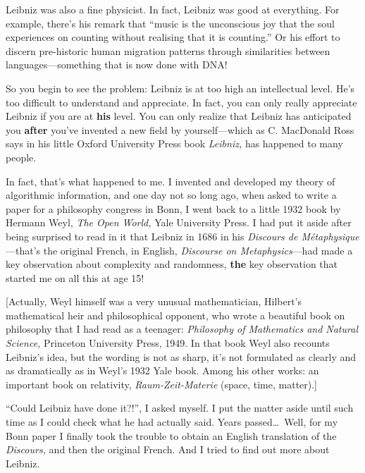 \documentclass[12pt]{book}
\begin{document}
Leibniz was also a fine physicist. In fact, Leibniz was good at everything.
For example, there's his remark that ``music is the unconscious joy that the
soul experiences on counting without realising that it is counting.''
Or his effort to discern pre-historic human migration patterns through similarities
between languages---something that is now done with DNA!
 
So you begin to see the problem: Leibniz is at too high an intellectual level.
He's too difficult to understand and appreciate.  In fact, you can only 
really appreciate Leibniz if you are at \textbf{his} level.
You can only 
realize that Leibniz has anticipated you
\textbf{after} you've invented a new field by yourself---which as C. MacDonald Ross
says in his little Oxford University Press book \emph{Leibniz,} has happened to
many people.
 
In fact, that's what happened to me. I invented and developed my
theory of algorithmic information, and one day not so long ago, when asked
to write a paper for a philosophy congress in Bonn, I went back to a little
1932 book by Hermann Weyl, \emph{The Open World,} Yale University Press.
I had put it aside after being surprised to read in it that Leibniz in
1686 in his \emph{Discours de M\'etaphysique}---that's the original French,
in English, \emph{Discourse on Metaphysics}---had made a key observation
about complexity and randomness, \textbf{the} key observation that started
me on all this at age 15!
 
\medskip

{\footnotesize [Actually, Weyl himself was a very unusual mathematician, Hilbert's mathematical heir and
philosophical opponent, who wrote a beautiful book on philosophy that I had
read as a teenager: \emph{Philosophy of Mathematics and Natural Science,}
Princeton University Press, 1949. In that book Weyl also recounts Leibniz's idea,
but the wording is not as sharp, it's not formulated as clearly and as dramatically as in Weyl's
1932 Yale book. Among his other works: an important book on relativity, \emph{Raum-Zeit-Materie}
(space, time, matter).]

}
\medskip
 
``Could Leibniz have done it?!'', I asked myself. I put the matter aside until such time as
I could check what he had actually said. Years passed\ldots\  Well, for my Bonn paper I finally
took the trouble to obtain an English translation of the \emph{Discours,}
and then the original French. 
And I tried to find out more about Leibniz.
 
\end{document}
